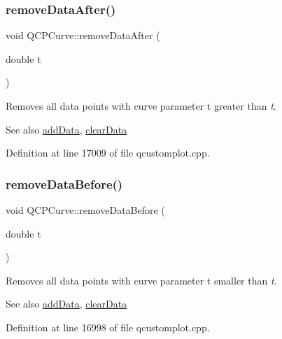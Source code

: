 \mbox{\label{class_q_c_p_curve_a0365cb947c4e6d405ee22e00191d5f52}} 
\subsubsection{\texorpdfstring{remove\+Data\+After()}{removeDataAfter()}}
{\footnotesize\ttfamily void Q\+C\+P\+Curve\+::remove\+Data\+After (\begin{DoxyParamCaption}\item[{double}]{t }\end{DoxyParamCaption})}

Removes all data points with curve parameter t greater than {\itshape t}. \begin{DoxySeeAlso}{See also}
\hyperlink{class_q_c_p_curve_a4e24023c3b9ac75440c7a260172c99af}{add\+Data}, \hyperlink{class_q_c_p_curve_ae0462c61dbfbac07db0736ec64110241}{clear\+Data} 
\end{DoxySeeAlso}


Definition at line 17009 of file qcustomplot.\+cpp.

\mbox{\label{class_q_c_p_curve_af6f4284fbc2f34e676f24dce03c34fe5}} 
\subsubsection{\texorpdfstring{remove\+Data\+Before()}{removeDataBefore()}}
{\footnotesize\ttfamily void Q\+C\+P\+Curve\+::remove\+Data\+Before (\begin{DoxyParamCaption}\item[{double}]{t }\end{DoxyParamCaption})}

Removes all data points with curve parameter t smaller than {\itshape t}. \begin{DoxySeeAlso}{See also}
\hyperlink{class_q_c_p_curve_a4e24023c3b9ac75440c7a260172c99af}{add\+Data}, \hyperlink{class_q_c_p_curve_ae0462c61dbfbac07db0736ec64110241}{clear\+Data} 
\end{DoxySeeAlso}


Definition at line 16998 of file qcustomplot.\+cpp.

